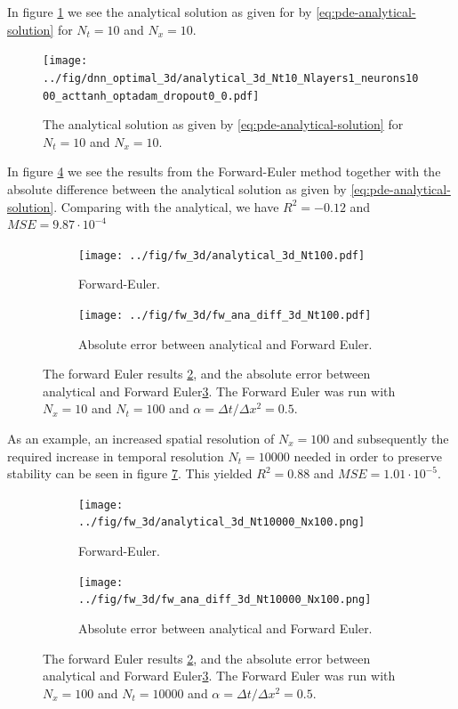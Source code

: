 In figure \ref{fig:analytical-solution} we see the analytical solution as given for by \eqref{eq:pde-analytical-solution} for $N_t=10$ and $N_x=10$.
\begin{figure}[h!tb]
    \centering
    \texttt{[image: ../fig/dnn\_optimal\_3d/analytical\_3d\_Nt10\_Nlayers1\_neurons1000\_acttanh\_optadam\_dropout0\_0.pdf]}
    \caption{The analytical solution as given by \eqref{eq:pde-analytical-solution} for $N_t=10$ and $N_x=10$.}
    \label{fig:analytical-solution}
\end{figure}

In figure \ref{fig:3d-fw-comparison-plots} we see the results from the Forward-Euler method together with the absolute difference between the analytical solution as given by \eqref{eq:pde-analytical-solution}. Comparing with the analytical, we have $R^2=-0.12$ and $MSE=9.87\cdot 10^{-4}$
\begin{figure}[h!tb]
    \centering
    \begin{subfigure}{0.5\textwidth}
        \centering
        \texttt{[image: ../fig/fw\_3d/analytical\_3d\_Nt100.pdf]}
        \caption{Forward-Euler.}
        \label{fig:fw-3d}
    \end{subfigure}
    \begin{subfigure}{0.5\textwidth}
        \centering
        \texttt{[image: ../fig/fw\_3d/fw\_ana\_diff\_3d\_Nt100.pdf]}
        \caption{Absolute error between analytical and Forward Euler.}
        \label{fig:fw-ana-diff-3d}
    \end{subfigure}
    \caption{The forward Euler results \ref{fig:fw-3d}, and the absolute error between analytical and Forward Euler\ref{fig:fw-ana-diff-3d}. The Forward Euler was run with $N_x=10$ and $N_t=100$ and $\alpha=\Delta t / \Delta x^2=0.5$.}
    \label{fig:3d-fw-comparison-plots}
\end{figure}

As an example, an increased spatial resolution of $N_x=100$ and subsequently the required increase in temporal resolution $N_t=10000$ needed in order to preserve stability can be seen in figure \ref{fig:3d-fw-comparison-plots-spatial-highres}. This yielded $R^2=0.88$ and $MSE=1.01\cdot 10^{-5}$.
\begin{figure}[h!tb]
    \centering
    \begin{subfigure}{0.5\textwidth}
        \centering
        \texttt{[image: ../fig/fw\_3d/analytical\_3d\_Nt10000\_Nx100.png]}
        \caption{Forward-Euler.}
        \label{fig:fw-3d-highres}
    \end{subfigure}
    \begin{subfigure}{0.5\textwidth}
        \centering
        \texttt{[image: ../fig/fw\_3d/fw\_ana\_diff\_3d\_Nt10000\_Nx100.png]}
        \caption{Absolute error between analytical and Forward Euler.}
        \label{fig:fw-ana-diff-3d-highres}
    \end{subfigure}
    \caption{The forward Euler results \ref{fig:fw-3d}, and the absolute error between analytical and Forward Euler\ref{fig:fw-ana-diff-3d}. The Forward Euler was run with $N_x=100$ and $N_t=10000$ and $\alpha=\Delta t / \Delta x^2=0.5$.}
    \label{fig:3d-fw-comparison-plots-spatial-highres}
\end{figure}

